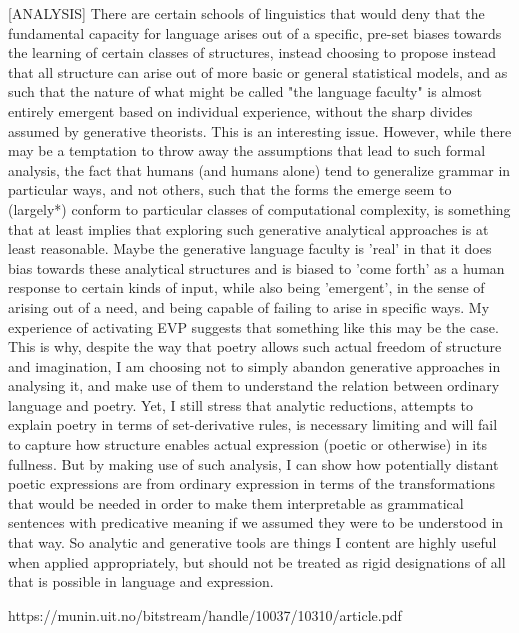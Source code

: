\documentclass[]{article}
\begin{document}
[ANALYSIS] There are certain schools of linguistics that would deny that the fundamental capacity for language arises out of a specific, pre-set biases towards the learning of certain classes of structures, instead choosing to propose instead that all structure can arise out of more basic or general statistical models, and as such that the nature of what might be called "the language faculty" is almost entirely emergent based on individual experience, without the sharp divides assumed by generative theorists. This is an interesting issue. However, while there may be a temptation to throw away the assumptions that lead to such formal analysis, the fact that humans (and humans alone) tend to generalize grammar in particular ways, and not others, such that the forms the emerge seem to (largely*) conform to particular classes of computational complexity, is something that at least implies that exploring such generative analytical approaches is at least reasonable. Maybe the generative language faculty is 'real' in that it does bias towards these analytical structures and is biased to 'come forth' as a human response to certain kinds of input, while also being 'emergent', in the sense of arising out of a need, and being capable of failing to arise in specific ways. My experience of activating EVP suggests that something like this may be the case. This is why, despite the way that poetry allows such actual freedom of structure and imagination, I am choosing not to simply abandon generative approaches in analysing it, and make use of them to understand the relation between ordinary language and poetry. Yet, I still stress that analytic reductions, attempts to explain poetry in terms of set-derivative rules, is necessary limiting and will fail to capture how structure enables actual expression (poetic or otherwise) in its fullness. But by making use of such analysis, I can show how potentially distant poetic expressions are from ordinary expression in terms of the transformations that would be needed in order to make them interpretable as grammatical sentences with predicative meaning if we assumed they were to be understood in that way. So analytic and generative tools are things I content are highly useful when applied appropriately, but should not be treated as rigid designations of all that is possible in language and expression.



https://munin.uit.no/bitstream/handle/10037/10310/article.pdf



\subsubsection{}
\end{document}
